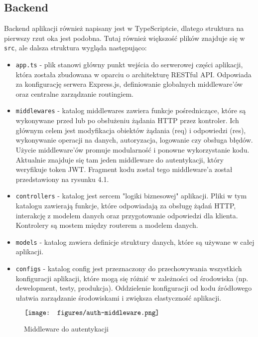 \documentclass[shortabstract,inz]{iithesis}
\begin{document}
\subsection{Backend}

Backend aplikacji również napisany jest w TypeScriptcie, dlatego struktura na pierwszy rzut oka jest podobna. Tutaj również większość plików znajduje się w \texttt{src}, ale dalsza struktura wygląda następująco:

\begin{itemize}
    \item \texttt{app.ts} - plik stanowi główny punkt wejścia do serwerowej części aplikacji, która została zbudowana w oparciu o architekturę RESTful API. Odpowiada za konfigurację serwera Express.js, definiowanie globalnych middleware'ów oraz centralne zarządzanie routingiem.

    \item \texttt{middlewares} - katalog middlewares zawiera funkcje pośredniczące, które są wykonywane przed lub po obsłużeniu żądania HTTP przez kontroler. Ich głównym celem jest modyfikacja obiektów żądania (req) i odpowiedzi (res), wykonywanie operacji na danych, autoryzacja, logowanie czy obsługa błędów. Użycie middleware'ów promuje modularność i ponowne wykorzystanie kodu. Aktualnie znajduje się tam jeden middleware do autentykacji, który weryfikuje token JWT. \cite{bib:jwt} Fragment kodu został tego middleware'a został przedstawiony na rysunku 4.1.

    \item \texttt{controllers} - katalog jest sercem "logiki biznesowej" aplikacji. Pliki w tym katalogu zawierają funkcje, które odpowiadają za obsługę żądań HTTP, interakcję z modelem danych oraz przygotowanie odpowiedzi dla klienta. Kontrolery są mostem między routerem a modelem danych.

    \item \texttt{models} - katalog zawiera definicje struktury danych, które są używane w całej aplikacji.

    \item \texttt{configs} - katalog config jest przeznaczony do przechowywania wszystkich konfiguracji aplikacji, które mogą się różnić w zależności od środowiska (np. dewelopment, testy, produkcja). Oddzielenie konfiguracji od kodu źródłowego ułatwia zarządzanie środowiskami i zwiększa elastyczność aplikacji.

\end{itemize}

\begin{figure}[H]
	\centering
	$\vcenter{\hbox{\texttt{[image: figures/auth-middleware.png]}}}$
    \caption[]{Middleware do autentykacji}
    \label{fig:auth-middleware}
\end{figure}
\end{document}
